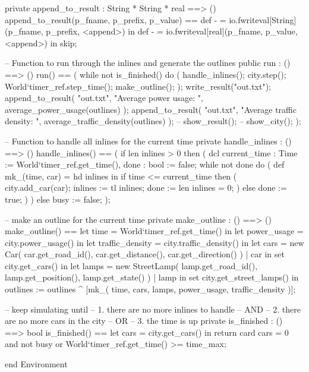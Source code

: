\documentclass[a4paper]{article}
\begin{document}
\begin{vdm_al}
    private append_to_result : String * String * real ==> ()
    append_to_result(p_fname, p_prefix, p_value) ==
        def - = io.fwriteval[String](p_fname, p_prefix, <append>) in
        def - = io.fwriteval[real](p_fname, p_value, <append>) in skip;

    -- Function to run through the inlines and generate the outlines
    public run : () ==> ()
    run() == (
        while not is_finished() do (
            handle_inlines();
            city.step();
            World`timer_ref.step_time();
            make_outline();
        );
        write_result("out.txt");
        append_to_result(
            "out.txt",
            "Average power usage: ",
            average_power_usage(outlines)
        );
        append_to_result(
            "out.txt",
            "Average traffic density: ",
            average_traffic_density(outlines)
        );
        -- show_result();
        -- show_city();
    );

    -- Function to handle all inlines for the current time
    private handle_inlines : () ==> ()
    handle_inlines() == (
        if len inlines > 0 then (
            dcl current_time : Time := World`timer_ref.get_time(),
                done : bool := false;
            while not done do (
                def mk_(time, car) = hd inlines in
                if time <= current_time then (
                    city.add_car(car);
                    inlines := tl inlines;
                    done := len inlines = 0;
                )
                else done := true;
            )
        )
        else busy := false;
    );

    -- make an outline for the current time
    private make_outline : () ==> ()
    make_outline() ==
        let time = World`timer_ref.get_time() in
        let power_usage = city.power_usage() in
        let traffic_density = city.traffic_density() in
        let cars = {
            new Car(
                car.get_road_id(),
                car.get_distance(),
                car.get_direction()
            ) | car in set city.get_cars()
        } in 
        let lamps = {
            new StreetLamp(
                lamp.get_road_id(),
                lamp.get_position(),
                lamp.get_state()
            ) | lamp in set city.get_street_lamps()
        } in
        outlines := outlines ^ [mk_(
            time,
            cars, lamps,
            power_usage,
            traffic_density
        )];

    -- keep simulating until
    -- 1. there are no more inlines to handle
    -- AND
    -- 2. there are no more cars in the city
    -- OR
    -- 3. the time is up
    private is_finished : () ==> bool 
    is_finished() == 
        let cars = city.get_cars() in
        return card cars = 0 and not busy
            or World`timer_ref.get_time() >= time_max;
    
end Environment
\end{vdm_al}
\end{document}
